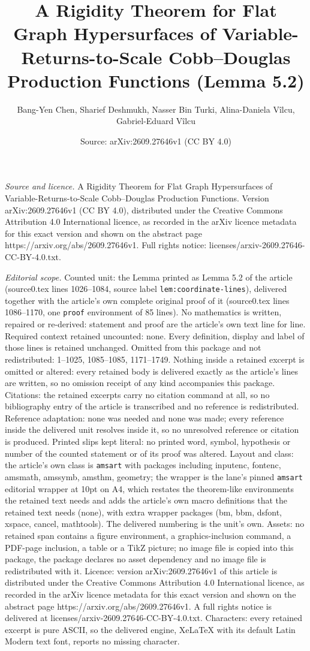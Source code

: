 \documentclass[10pt,a4paper]{amsart}
\title[A Rigidity Theorem for Flat Graph Hypersurfaces of Variable-]{A Rigidity Theorem for Flat Graph Hypersurfaces of Variable-Returns-to-Scale Cobb--Douglas Production Functions (Lemma 5.2)}
\author{Bang-Yen Chen, Sharief Deshmukh, Nasser Bin Turki, Alina-Daniela V\^ilcu, Gabriel-Eduard V\^ilcu}
\date{Source: arXiv:2609.27646v1 (CC BY 4.0)}
\begin{document}
\maketitle

\noindent\emph{Source and licence.} A Rigidity Theorem for Flat Graph Hypersurfaces of Variable-Returns-to-Scale Cobb--Douglas Production Functions. Version arXiv:2609.27646v1 (CC BY 4.0), distributed under the Creative Commons Attribution 4.0 International licence, as recorded in the arXiv licence metadata for this exact version and shown on the abstract page https://arxiv.org/abs/2609.27646v1. Full rights notice: licenses/arxiv-2609.27646-CC-BY-4.0.txt.\par\smallskip

\noindent\textit{Editorial scope.} Counted unit: the Lemma printed as Lemma 5.2 of the article (source0.tex lines 1026--1084, source label \texttt{lem:coordinate-lines}), delivered together with the article's own complete original proof of it (source0.tex lines 1086--1170, one \texttt{proof} environment of 85 lines). No mathematics is written, repaired or re-derived: statement and proof are the article's own text line for line. Required context retained uncounted: none. Every definition, display and label of those lines is retained unchanged. Omitted from this package and not redistributed: 1--1025, 1085--1085, 1171--1749. Nothing inside a retained excerpt is omitted or altered: every retained body is delivered exactly as the article's lines are written, so no omission receipt of any kind accompanies this package. Citations: the retained excerpts carry no citation command at all, so no bibliography entry of the article is transcribed and no reference is redistributed. Reference adaptation: none was needed and none was made; every reference inside the delivered unit resolves inside it, so no unresolved reference or citation is produced. Printed slips kept literal: no printed word, symbol, hypothesis or number of the counted statement or of its proof was altered. Layout and class: the article's own class is \texttt{amsart} with packages including inputenc, fontenc, amsmath, amssymb, amsthm, geometry; the wrapper is the lane's pinned \texttt{amsart} editorial wrapper at 10pt on A4, which restates the theorem-like environments the retained text needs and adds the article's own macro definitions that the retained text needs (none), with extra wrapper packages (bm, bbm, dsfont, xspace, cancel, mathtools). The delivered numbering is the unit's own. Assets: no retained span contains a figure environment, a graphics-inclusion command, a PDF-page inclusion, a table or a TikZ picture; no image file is copied into this package, the package declares no asset dependency and no image file is redistributed with it. Licence: version arXiv:2609.27646v1 of this article is distributed under the Creative Commons Attribution 4.0 International licence, as recorded in the arXiv licence metadata for this exact version and shown on the abstract page https://arxiv.org/abs/2609.27646v1. A full rights notice is delivered at licenses/arxiv-2609.27646-CC-BY-4.0.txt. Characters: every retained excerpt is pure ASCII, so the delivered engine, XeLaTeX with its default Latin Modern text font, reports no missing character.
\end{document}
